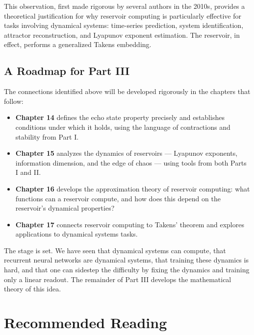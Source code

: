 This observation, first made rigorous by several authors in the 2010s, provides a theoretical justification for why reservoir computing is particularly effective for tasks involving dynamical systems: time-series prediction, system identification, attractor reconstruction, and Lyapunov exponent estimation. The reservoir, in effect, performs a generalized Takens embedding.

\subsection{A Roadmap for Part III}\label{sec:13.6.5}

The connections identified above will be developed rigorously in the chapters that follow:

\begin{itemize}[nosep]
  \item \textbf{Chapter 14} defines the echo state property precisely and establishes conditions under which it holds, using the language of contractions and stability from Part I.
  \item \textbf{Chapter 15} analyzes the dynamics of reservoirs --- Lyapunov exponents, information dimension, and the edge of chaos --- using tools from both Parts I and II.
  \item \textbf{Chapter 16} develops the approximation theory of reservoir computing: what functions can a reservoir compute, and how does this depend on the reservoir's dynamical properties?
  \item \textbf{Chapter 17} connects reservoir computing to Takens' theorem and explores applications to dynamical systems tasks.
\end{itemize}

The stage is set. We have seen that dynamical systems can compute, that recurrent neural networks are dynamical systems, that training these dynamics is hard, and that one can sidestep the difficulty by fixing the dynamics and training only a linear readout. The remainder of Part III develops the mathematical theory of this idea.


\bigskip


\section*{Recommended Reading}

